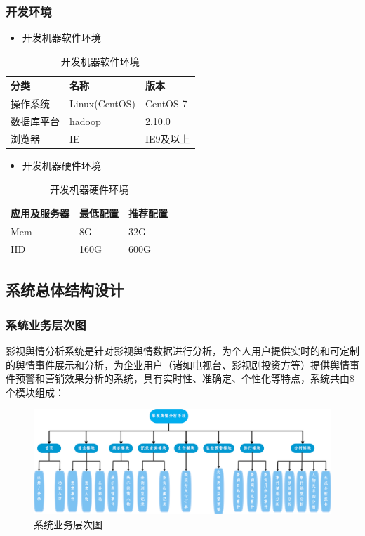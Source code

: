 \subsubsection{开发环境}
\begin{itemize}
	\item 开发机器软件环境
\end{itemize}
\begin{table}[!htbp]
	\centering
	\caption{开发机器软件环境}
	\label{tab:my-table2}
	\begin{tabular}{|l|l|l|}
		\hline
		分类 & 名称 & 版本 \\ \hline
		操作系统 & Linux(CentOS) & CentOS 7  \\ \hline
		数据库平台 & hadoop & 2.10.0  \\ \hline
		浏览器 & IE & IE9及以上  \\ \hline
	\end{tabular}
\end{table}
\begin{itemize}
	\item 开发机器硬件环境
\end{itemize}	
\begin{table}[!htbp]
	\centering
	\caption{开发机器硬件环境}
	\label{tab:my-table3}
	\begin{tabular}{|l|l|l|}
		\hline
		应用及服务器 & 最低配置 & 推荐配置 \\ \hline
		Mem & 8G & 32G \\ \hline
		HD & 160G & 600G \\ \hline
	\end{tabular}
\end{table}

\subsection{系统总体结构设计}

\subsubsection{系统业务层次图}
影视舆情分析系统是针对影视舆情数据进行分析，为个人用户提供实时的和可定制的舆情事件展示和分析，为企业用户（诸如电视台、影视剧投资方等）提供舆情事件预警和营销效果分析的系统，具有实时性、准确定、个性化等特点，系统共由8个模块组成：
\begin{figure}[!htbp]
	\centering
	\includegraphics[scale=0.4]{image/o1.png}
	\caption{系统业务层次图}
\end{figure}

